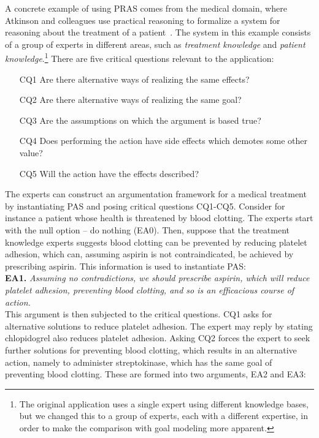 \documentclass[11.5pt,two column]{llncs}
\begin{document}
A concrete example of using PRAS comes from the medical domain, where Atkinson and colleagues use practical reasoning to formalize a system for reasoning about the treatment of a patient~\cite{atkinson2006argumentation}. The system in this example consists of a group of experts in different areas, such as \emph{treatment knowledge} and \emph{patient knowledge}.\footnote{The original application uses a single expert using different knowledge bases, but we changed this to a group of experts, each with a different expertise, in order to make the comparison with goal modeling more apparent.} There are five critical questions relevant to the application:
\begin{enumerate}
\item[CQ1] Are there alternative ways of realizing the same effects?
\item[CQ2] Are there alternative ways of realizing the same goal?
\item[CQ3] Are the assumptions on which the argument is based true?
\item[CQ4] Does performing the action have side effects which demotes some other value?
\item[CQ5] Will the action have the effects described?
\end{enumerate}

The experts can construct an argumentation framework for a medical treatment by instantiating PAS and posing critical questions CQ1-CQ5. Consider for instance a patient whose health is threatened by blood clotting. The experts start with the null option \--- do nothing (EA0). Then, suppose that the treatment knowledge experts suggests blood clotting can be prevented by reducing platelet adhesion, which can, assuming aspirin is not contraindicated, be achieved by prescribing aspirin. This information is used to instantiate PAS:\\

\noindent
\textbf{EA1.} \emph{Assuming no contradictions, we should prescribe aspirin, which will reduce platelet adhesion, preventing blood clotting, and so is an efficacious course of action.}\\

\noindent
This argument is then subjected to the critical questions. CQ1 asks for alternative solutions to reduce platelet adhesion. The expert may reply by stating chlopidogrel also reduces platelet adhesion. Asking CQ2 forces the expert to seek further solutions for preventing blood clotting, which results in an alternative action, namely to administer streptokinase, which has the same goal of preventing blood clotting. These are formed into two arguments, EA2 and EA3:\\
\end{document}

